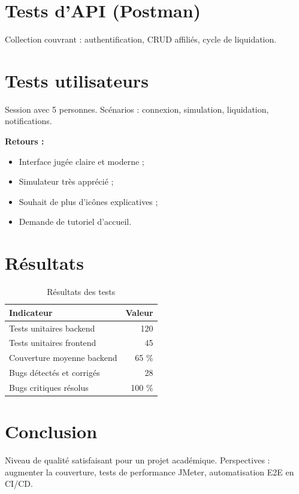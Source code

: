 \documentclass[12pt,a4paper,oneside]{report}
\begin{document}
\section{Tests d'API (Postman)}
Collection couvrant : authentification, CRUD affiliés, cycle de liquidation.

\section{Tests utilisateurs}
Session avec 5 personnes. Scénarios : connexion, simulation, liquidation, notifications.

\textbf{Retours :}
\begin{itemize}
    \item Interface jugée claire et moderne ;
    \item Simulateur très apprécié ;
    \item Souhait de plus d'icônes explicatives ;
    \item Demande de tutoriel d'accueil.
\end{itemize}

\section{Résultats}
\begin{table}[H]
\centering
\caption{Résultats des tests}
\begin{tabular}{lr}
\toprule
\textbf{Indicateur} & \textbf{Valeur} \\
\midrule
Tests unitaires backend & 120 \\
Tests unitaires frontend & 45 \\
Couverture moyenne backend & 65 \% \\
Bugs détectés et corrigés & 28 \\
Bugs critiques résolus & 100 \% \\
\bottomrule
\end{tabular}
\end{table}

\section{Conclusion}
Niveau de qualité satisfaisant pour un projet académique. Perspectives : augmenter la couverture, tests de performance JMeter, automatisation E2E en CI/CD.

\end{document}
